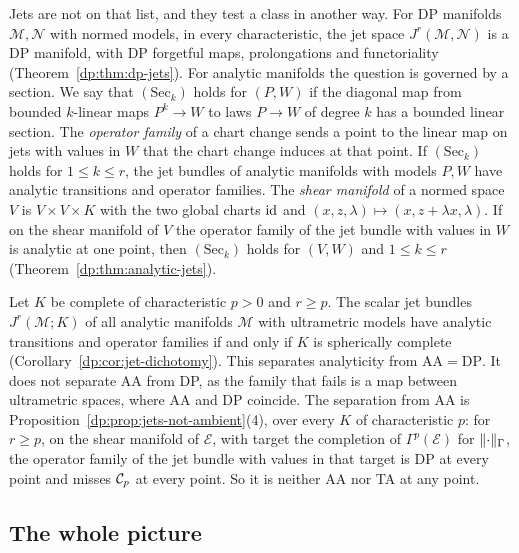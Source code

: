 Jets are not on that list, and they test a class in another way. For DP manifolds $\mathcal M,\mathcal N$ with normed models, in every characteristic, the jet space $J^r(\mathcal M,\mathcal N)$ is a DP manifold, with DP forgetful maps, prolongations and functoriality (Theorem~\ref{dp:thm:dp-jets}). For analytic manifolds the question is governed by a section. We say that $(\mathrm{Sec}_k)$ holds for $(P,W)$ if the diagonal map from bounded $k$-linear maps $P^k\to W$ to laws $P\to W$ of degree $k$ has a bounded linear section. The \emph{operator family} of a chart change sends a point to the linear map on jets with values in $W$ that the chart change induces at that point. If $(\mathrm{Sec}_k)$ holds for $1\le k\le r$, the jet bundles of analytic manifolds with models $P,W$ have analytic transitions and operator families. The \emph{shear manifold} of a normed space $V$ is $V\times V\times K$ with the two global charts $\mathrm{id}$ and $(x,z,\lambda)\mapsto(x,z+\lambda x,\lambda)$. If on the shear manifold of $V$ the operator family of the jet bundle with values in $W$ is analytic at one point, then $(\mathrm{Sec}_k)$ holds for $(V,W)$ and $1\le k\le r$ (Theorem~\ref{dp:thm:analytic-jets}).

Let $K$ be complete of characteristic $p>0$ and $r\ge p$. The scalar jet bundles $J^r(\mathcal M;K)$ of all analytic manifolds $\mathcal M$ with ultrametric models have analytic transitions and operator families if and only if $K$ is spherically complete (Corollary~\ref{dp:cor:jet-dichotomy}). This separates analyticity from $\mathrm{AA}=\mathrm{DP}$. It does not separate AA from DP, as the family that fails is a map between ultrametric spaces, where AA and DP coincide. The separation from AA is Proposition~\ref{dp:prop:jets-not-ambient}(4), over every $K$ of characteristic $p$: for $r\ge p$, on the shear manifold of $\mathcal E$, with target the completion of $\Gamma^p(\mathcal E)$ for $\lVert \cdot\rVert_\Gamma$, the operator family of the jet bundle with values in that target is DP at every point and misses $\mathcal{C}_p$ at every point. So it is neither AA nor TA at any point.

\subsection*{The whole picture}

